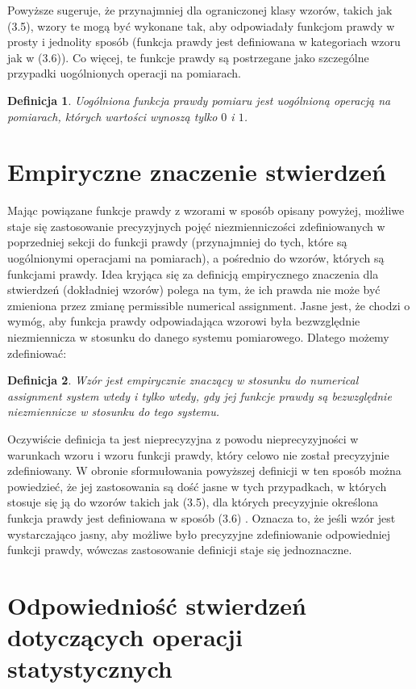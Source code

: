 \documentclass[12pt,a4paper]{report}
\newtheorem{definition}{Definicja}[chapter]
\begin{document}
Powyższe sugeruje, że przynajmniej dla ograniczonej klasy wzorów, takich jak (3.5), wzory te mogą być wykonane tak, aby odpowiadały funkcjom prawdy w prosty i jednolity sposób (funkcja prawdy jest definiowana w kategoriach wzoru jak w (3.6)). Co więcej, te funkcje prawdy są postrzegane jako szczególne przypadki uogólnionych operacji na pomiarach.
\begin{definition}
Uogólniona funkcja prawdy pomiaru jest uogólnioną operacją na pomiarach, których wartości wynoszą tylko $0$ i $1$.
\end{definition}
\section{Empiryczne znaczenie stwierdzeń}

Mając powiązane funkcje prawdy z wzorami w sposób opisany powyżej, możliwe staje się zastosowanie precyzyjnych pojęć niezmienniczości zdefiniowanych w poprzedniej sekcji do funkcji prawdy (przynajmniej do tych, które są uogólnionymi operacjami na pomiarach), a pośrednio do wzorów, których są funkcjami prawdy. Idea kryjąca się za definicją empirycznego znaczenia dla stwierdzeń (dokładniej wzorów) polega na tym, że ich prawda nie może być zmieniona przez zmianę permissible numerical assignment. Jasne jest, że chodzi o wymóg, aby funkcja prawdy odpowiadająca wzorowi była bezwzględnie niezmiennicza w stosunku do danego systemu pomiarowego. Dlatego możemy zdefiniować:
\begin{definition}
Wzór jest empirycznie znaczący w stosunku do numerical assignment system wtedy i tylko wtedy, gdy jej funkcje prawdy są bezwzględnie niezmiennicze w stosunku do  tego systemu.
\end{definition}
Oczywiście definicja ta jest nieprecyzyjna z powodu nieprecyzyjności w warunkach wzoru i wzoru funkcji prawdy, który celowo nie został precyzyjnie zdefiniowany. W obronie sformułowania powyższej definicji w ten sposób można powiedzieć, że jej zastosowania są dość jasne w tych przypadkach, w których stosuje się ją do wzorów takich jak (3.5), dla których precyzyjnie określona funkcja prawdy jest definiowana w sposób (3.6) . Oznacza to, że jeśli wzór jest wystarczająco jasny, aby możliwe było precyzyjne zdefiniowanie odpowiedniej funkcji prawdy, wówczas zastosowanie definicji staje się jednoznaczne.
\section{Odpowiedniość stwierdzeń dotyczących operacji statystycznych}
\end{document}
